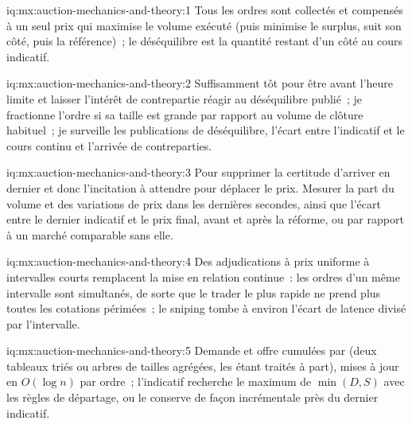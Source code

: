 \begin{solution}{iq:mx:auction-mechanics-and-theory:1}
Tous les ordres sont collectés et compensés à un seul prix qui maximise le volume exécuté (puis minimise le surplus, suit son côté, puis la référence)~;
le déséquilibre est la quantité restant d'un côté au cours indicatif.
\end{solution}

\begin{solution}{iq:mx:auction-mechanics-and-theory:2}
Suffisamment tôt pour être avant l'heure limite et laisser l'intérêt de contrepartie réagir au déséquilibre publié~; je fractionne l'ordre si sa taille est grande par rapport au volume
de clôture habituel~; je surveille les publications de déséquilibre, l'écart entre l'indicatif et le cours continu et l'arrivée de contreparties.
\end{solution}

\begin{solution}{iq:mx:auction-mechanics-and-theory:3}
Pour supprimer la certitude d'arriver en dernier et donc l'incitation à attendre pour déplacer le prix. Mesurer la part du volume et des variations de prix dans les dernières
secondes, ainsi que l'écart entre le dernier indicatif et le prix final, avant et après la réforme, ou par rapport à un marché comparable sans elle.
\end{solution}

\begin{solution}{iq:mx:auction-mechanics-and-theory:4}
Des adjudications à prix uniforme à intervalles courts remplacent la mise en relation continue~: les ordres d'un même intervalle sont simultanés, de sorte que le trader le plus rapide
ne prend plus toutes les cotations périmées~; le sniping tombe à environ l'écart de latence divisé par l'intervalle.
\end{solution}

\begin{solution}{iq:mx:auction-mechanics-and-theory:5}
Demande et offre cumulées par  (deux tableaux triés ou arbres de tailles agrégées, les  étant traités à part), mises à jour en $O(\log n)$ par
ordre~; l'indicatif recherche le maximum de $\min(D,S)$ avec les règles de départage, ou le conserve de façon incrémentale près du dernier indicatif.
\end{solution}

